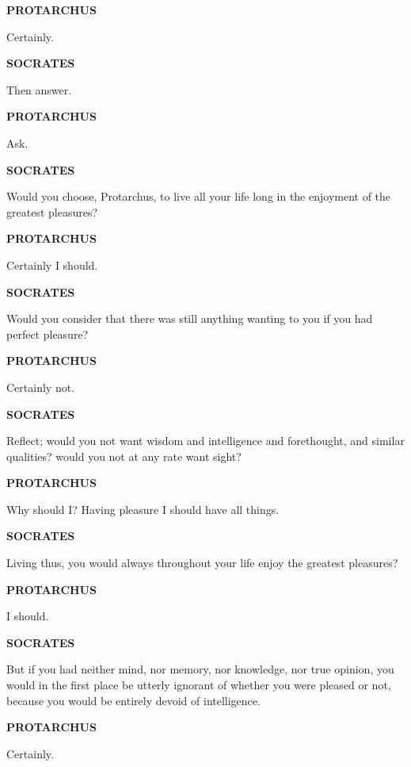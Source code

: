 \documentclass[11pt,letter]{article}
\begin{document}
\par \textbf{PROTARCHUS}
\par   Certainly.

\par \textbf{SOCRATES}
\par   Then answer.

\par \textbf{PROTARCHUS}
\par   Ask.

\par \textbf{SOCRATES}
\par   Would you choose, Protarchus, to live all your life long in the enjoyment of the greatest pleasures?

\par \textbf{PROTARCHUS}
\par   Certainly I should.

\par \textbf{SOCRATES}
\par   Would you consider that there was still anything wanting to you if you had perfect pleasure?

\par \textbf{PROTARCHUS}
\par   Certainly not.

\par \textbf{SOCRATES}
\par   Reflect; would you not want wisdom and intelligence and forethought, and similar qualities? would you not at any rate want sight?

\par \textbf{PROTARCHUS}
\par   Why should I? Having pleasure I should have all things.

\par \textbf{SOCRATES}
\par   Living thus, you would always throughout your life enjoy the greatest pleasures?

\par \textbf{PROTARCHUS}
\par   I should.

\par \textbf{SOCRATES}
\par   But if you had neither mind, nor memory, nor knowledge, nor true opinion, you would in the first place be utterly ignorant of whether you were pleased or not, because you would be entirely devoid of intelligence.

\par \textbf{PROTARCHUS}
\par   Certainly.
\end{document}
